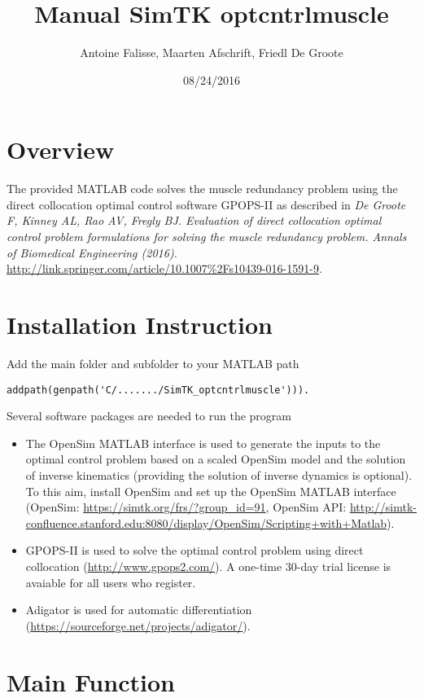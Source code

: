 \documentclass[a4paper,oneside,11pt]{article}
\begin{document}
\title{Manual SimTK optcntrlmuscle}
\author{Antoine Falisse, Maarten Afschrift, Friedl De Groote}
\date{08/24/2016} 
\maketitle
\tableofcontents

\section{Overview}

The provided MATLAB code solves the muscle redundancy problem using the direct collocation optimal control software GPOPS-II as described in \textit{De Groote F, Kinney AL, Rao AV, Fregly BJ. Evaluation of direct collocation optimal control problem formulations for solving the muscle redundancy problem. Annals of Biomedical Engineering (2016).} \url{http://link.springer.com/article/10.1007%2Fs10439-016-1591-9}.

\section{Installation Instruction}

Add the main folder and subfolder to your MATLAB path 
\begin{lstlisting}
addpath(genpath('C/......./SimTK_optcntrlmuscle'))).
\end{lstlisting}

Several software packages are needed to run the program
\begin{itemize}
	\item The OpenSim MATLAB interface is used to generate the inputs to the optimal control problem based on a scaled OpenSim model and the solution of inverse kinematics (providing the solution of inverse dynamics is optional). To this aim, install OpenSim and set up the OpenSim MATLAB interface (OpenSim: \url{https://simtk.org/frs/?group_id=91}, OpenSim API: \url{http://simtk-confluence.stanford.edu:8080/display/OpenSim/Scripting+with+Matlab}).
	\item GPOPS-II is used to solve the optimal control problem using direct collocation (\url{http://www.gpops2.com/}). A one-time 30-day trial license is avaiable for all users who register.
	\item Adigator is used for automatic differentiation (\url{https://sourceforge.net/projects/adigator/}).
\end{itemize}

\section{Main Function}
\end{document}
